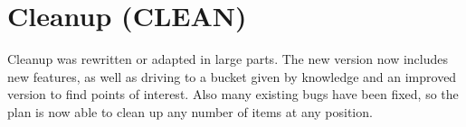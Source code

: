 \documentclass[main.tex]{subfiles}
\begin{document}
                \section{Cleanup (CLEAN)}
                Cleanup was rewritten or adapted in large parts. The new version now includes new features, as well as driving to a bucket given by knowledge and an improved version to find points of interest. Also many existing bugs have been fixed, so the plan is now able to clean up any number of items at any position.
                

	
\end{document}
